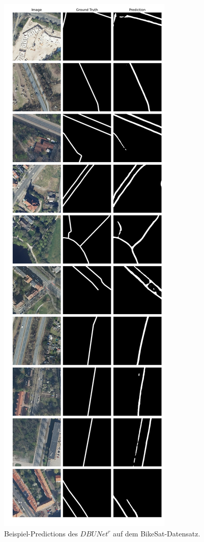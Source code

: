 \begin{figure}
	\centering
	\includegraphics[width=.41\textwidth]{Bilder/Samples-BikeSat/dbunet-r.png} 
	\caption{Beispiel-Predictions des $DBUNet^r$ auf dem BikeSat-Datensatz.}
	\label{fig:bikesat-samples-dbunet-r}
\end{figure}

